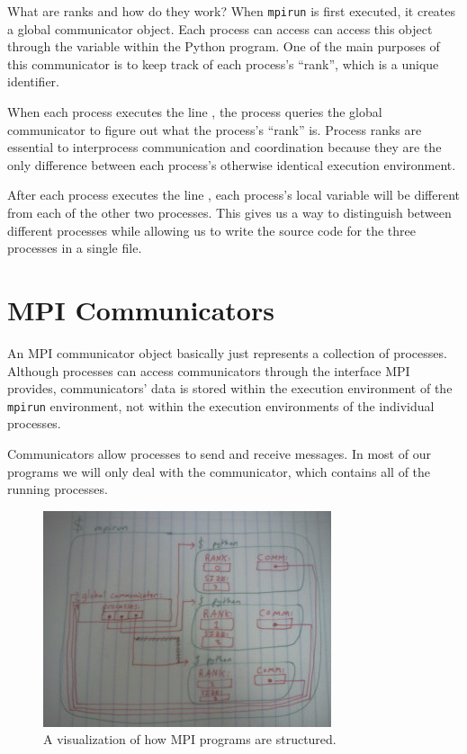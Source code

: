 What are ranks and how do they work? When \texttt{mpirun} is first executed, it
creates a global communicator object. Each process can access can access this
object through the variable  within the Python program. One
of the main purposes of this communicator is to keep track of each process's
``rank'', which is a unique identifier.

When each process executes the line , the process
queries the global communicator to figure out what the process's ``rank'' is.
Process ranks are essential to interprocess communication and coordination
because they are the only difference between each process's otherwise identical
execution environment.

After each process executes the line , each process's
local variable  will be different from each of the other two processes.
This gives us a way to distinguish between different processes while allowing us
to write the source code for the three processes in a single file.

\section*{MPI Communicators} An MPI communicator object basically just
represents a collection of processes. Although processes can access
communicators through the interface MPI provides, communicators' data is stored
within the execution environment of the \texttt{mpirun} environment, not within
the execution environments of the individual processes.

Communicators allow processes to send and receive messages. In most of our
programs we will only deal with the  communicator, which
contains all of the running processes.

\begin{figure}[htbp]
\centering
\includegraphics[width=.9\textwidth]{MPI program structure placeholder.jpg}
\caption{A visualization of how MPI programs are structured.}
\label{fig:MPI_program_structure}
\end{figure}

